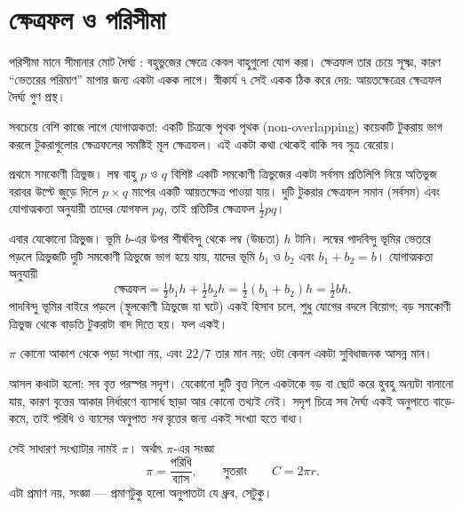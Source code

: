 \documentclass[11pt]{article}
\begin{document}
\section{ক্ষেত্রফল ও পরিসীমা}

\begin{idea}[ক্ষেত্রফল যোগাত্মক]
পরিসীমা মানে সীমানার মোট দৈর্ঘ্য : বহুভুজের ক্ষেত্রে কেবল বাহুগুলো যোগ করা।
ক্ষেত্রফল তার চেয়ে সূক্ষ্ম, কারণ ``ভেতরের পরিমাণ'' মাপার জন্য একটা একক লাগে।
স্বীকার্য ৭ সেই একক ঠিক করে দেয়: আয়তক্ষেত্রের ক্ষেত্রফল দৈর্ঘ্য গুণ প্রস্থ।

সবচেয়ে বেশি কাজে লাগে যোগাত্মকতা: একটি চিত্রকে পৃথক পৃথক (non-overlapping) কয়েকটি টুকরায়
ভাগ করলে টুকরাগুলোর ক্ষেত্রফলের সমষ্টিই মূল ক্ষেত্রফল। এই একটা কথা থেকেই
বাকি সব সূত্র বেরোয়।
\end{idea}

\begin{idea}[ত্রিভুজের ক্ষেত্রফল]
প্রথমে সমকোণী ত্রিভুজ। লম্ব বাহু $p$ ও $q$ বিশিষ্ট একটি সমকোণী ত্রিভুজের একটা
সর্বসম প্রতিলিপি নিয়ে অতিভুজ বরাবর উল্টে জুড়ে দিলে $p \times q$ মাপের একটি
আয়তক্ষেত্র পাওয়া যায়। দুটি টুকরার ক্ষেত্রফল সমান (সর্বসম) এবং যোগাত্মকতা অনুযায়ী
তাদের যোগফল $pq$, তাই প্রতিটির ক্ষেত্রফল $\tfrac{1}{2}pq$।

এবার যেকোনো ত্রিভুজ। ভূমি $b$-এর উপর শীর্ষবিন্দু থেকে লম্ব (উচ্চতা) $h$ টানি।
লম্বের পাদবিন্দু ভূমির ভেতরে পড়লে ত্রিভুজটি দুটি সমকোণী ত্রিভুজে ভাগ হয়ে যায়,
যাদের ভূমি $b_1$ ও $b_2$ এবং $b_1 + b_2 = b$। যোগাত্মকতা অনুযায়ী
\[
  \text{ক্ষেত্রফল} = \tfrac{1}{2}b_1 h + \tfrac{1}{2}b_2 h
  = \tfrac{1}{2}(b_1 + b_2)h = \tfrac{1}{2}bh .
\]
পাদবিন্দু ভূমির বাইরে পড়লে (স্থূলকোণী ত্রিভুজে যা ঘটে) একই হিসাব চলে, শুধু যোগের
বদলে বিয়োগ; বড় সমকোণী ত্রিভুজ থেকে বাড়তি টুকরাটা বাদ দিতে হয়। ফল একই।
\end{idea}

\begin{idea}[$\pi$ কোথা থেকে আসে]
$\pi$ কোনো আকাশ থেকে পড়া সংখ্যা নয়, এবং $22/7$ তার মান নয়; ওটা কেবল একটা
সুবিধাজনক আসন্ন মান।

আসল কথাটা হলো: সব বৃত্ত পরস্পর সদৃশ। যেকোনো দুটি বৃত্ত নিলে একটাকে বড় বা ছোট
করে হুবহু অন্যটা বানানো যায়, কারণ বৃত্তের আকার নির্ধারণে ব্যাসার্ধ ছাড়া আর কোনো
তথ্যই নেই। সদৃশ চিত্রে সব দৈর্ঘ্য একই অনুপাতে বাড়ে-কমে, তাই পরিধি ও ব্যাসের
অনুপাত \emph{সব} বৃত্তের জন্য একই সংখ্যা হতে বাধ্য।

সেই সাধারণ সংখ্যাটার নামই $\pi$। অর্থাৎ $\pi$-এর সংজ্ঞা
\[
  \pi = \frac{\text{পরিধি}}{\text{ব্যাস}}, \qquad\text{সুতরাং}\qquad C = 2\pi r .
\]
এটা প্রমাণ নয়, সংজ্ঞা --- প্রমাণটুকু হলো অনুপাতটা যে ধ্রুব, সেটুকু।
\end{idea}
\end{document}
